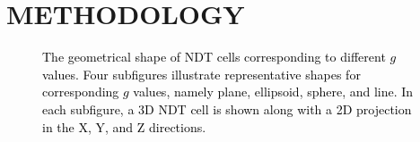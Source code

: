 \documentclass[letterpaper, 10 pt, conference]{ieeeconf}   %
\newcommand\kevin[1]{\textcolor{black}{#1}}
\begin{document}
\section{METHODOLOGY}

\begin{figure}
 \centering
 \begin{minipage}{1\linewidth} %
  \noindent
 \end{minipage}
 \vskip -0.3cm %
 \begin{minipage}{1\linewidth }
  \noindent
 \end{minipage}
 \caption{\kevin{The geometrical shape of NDT cells corresponding to different $g$ values. Four subfigures illustrate representative shapes for corresponding $g$ values, namely plane, ellipsoid, sphere, and line. In each subfigure, a 3D NDT cell is shown along with a 2D projection in the X, Y, and Z directions.}}
 \label{g_figure}
\end{figure}
\end{document}
